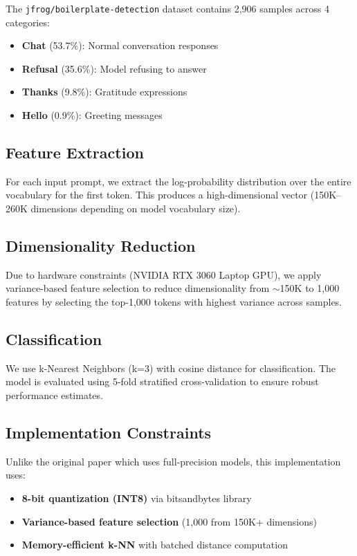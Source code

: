 \documentclass[11pt]{article}
\begin{document}
The \texttt{jfrog/boilerplate-detection} dataset contains 2,906 samples across 4 categories:
\begin{itemize}
    \item \textbf{Chat} (53.7\%): Normal conversation responses
    \item \textbf{Refusal} (35.6\%): Model refusing to answer
    \item \textbf{Thanks} (9.8\%): Gratitude expressions
    \item \textbf{Hello} (0.9\%): Greeting messages
\end{itemize}

\subsection{Feature Extraction}

For each input prompt, we extract the log-probability distribution over the entire vocabulary for the first token. This produces a high-dimensional vector (150K--260K dimensions depending on model vocabulary size).

\subsection{Dimensionality Reduction}

Due to hardware constraints (NVIDIA RTX 3060 Laptop GPU), we apply variance-based feature selection to reduce dimensionality from $\sim$150K to 1,000 features by selecting the top-1,000 tokens with highest variance across samples.

\subsection{Classification}

We use k-Nearest Neighbors (k=3) with cosine distance for classification. The model is evaluated using 5-fold stratified cross-validation to ensure robust performance estimates.

\subsection{Implementation Constraints}

Unlike the original paper which uses full-precision models, this implementation uses:
\begin{itemize}
    \item \textbf{8-bit quantization (INT8)} via bitsandbytes library
    \item \textbf{Variance-based feature selection} (1,000 from 150K+ dimensions)
    \item \textbf{Memory-efficient k-NN} with batched distance computation
\end{itemize}
\end{document}
